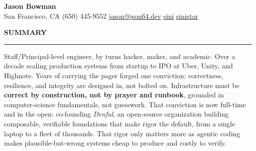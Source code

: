 \documentclass[11pt,letterpaper]{article}
\makeatletter
\newcommand{\header}[1]{%
  \vspace{6pt}%
  {\large\bfseries\color{accent}\MakeUppercase{#1}}\par\nobreak\vspace{-3pt}%
  {\color{accent}\rule{\linewidth}{0.9pt}}\par\nobreak\vspace{3pt}%
  \@afterheading}
\newcommand{\contact}[3]{%
  \begin{center}
  {\Huge\bfseries\color{accent}#1}\\[5pt]
  {\small\color{muted}#2 \quad\textbullet\quad #3}
  \end{center}
  \vspace{2pt}
}
\makeatother
\begin{document}
\contact{Jason Bowman}
{San Francisco, CA}
{\faPhone \hspace{0.1em} (650) 445-9552 \hspace{0.1em} \faEnvelope \hspace{0.1em}
  \href{mailto:jason@json64.dev}{jason@json64.dev} \hspace{0.1em} \faGithub \hspace{0.1em} \href{https://www.github.com/sini}{sini} \hspace{0.1em} \hspace{0.1em} \faLinkedin \hspace{0.1em}
  \href{https://linkedin.com/in/sinistar}{sinistar}}

\vspace*{3pt}

\header{Summary}
\noindent Staff/Principal-level engineer, by turns hacker, maker, and academic.
Over a decade scaling production systems from startup to IPO at Uber, Unity, and
Highnote. Years of carrying the pager forged one conviction: correctness, resilience,
and integrity are designed in, not bolted on. Infrastructure must be
{\bfseries\color{accent}correct by construction, not by prayer and runbook}, grounded in
computer-science fundamentals, not guesswork. That conviction is now full-time and in
the open: co-founding \emph{Denful}, an open-source organization building composable,
verifiable foundations that make rigor the default, from a single laptop to a fleet of
thousands. That rigor only matters more as agentic coding makes plausible-but-wrong
systems cheap to produce and costly to verify.

\end{document}

